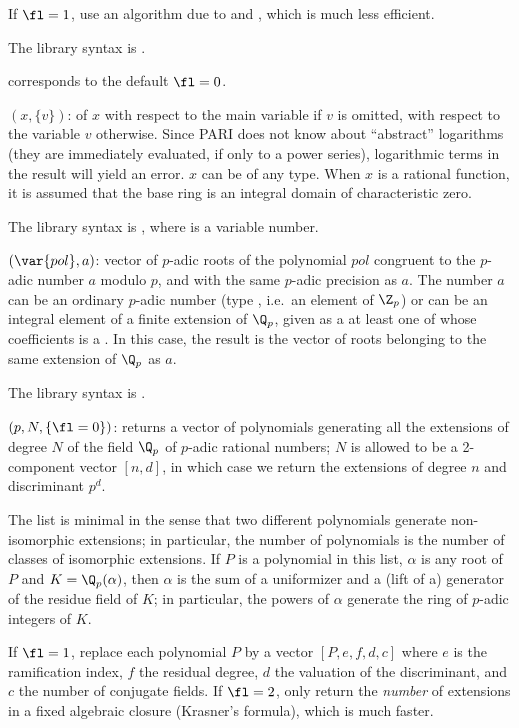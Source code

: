 If $\fl=1$, use an algorithm due to  and , which is
much less efficient.

The library syntax is .

 corresponds to the default
$\fl=0$.

$(x,\{v\})$: \label{se:intformal} of $x$ with respect to the main variable if $v$
is omitted, with respect to the variable $v$ otherwise. Since PARI does not
know about ``abstract'' logarithms (they are immediately evaluated, if only
to a power series), logarithmic terms in the result will yield an error. $x$
can be of any type. When $x$ is a rational function, it is assumed that the
base ring is an integral domain of characteristic zero.

The library syntax is , where  is a variable number.

$(\var{pol},a)$: \label{se:padicappr}vector of $p$-adic roots of the
polynomial $pol$ congruent to the $p$-adic number $a$ modulo $p$, and with
the same $p$-adic precision as $a$. The number $a$ can be an ordinary
$p$-adic number (type , i.e.~an element of $\Z_p$) or can be an
integral element of a finite extension of $\Q_p$, given as a 
at least one of whose coefficients is a . In this case, the result
is the vector of roots belonging to the same extension of $\Q_p$ as $a$.

The library syntax is .

$(p, N, \{\fl=0\})$: \label{se:padicfields}returns a vector of polynomials generating all the extensions of degree
$N$ of the field $\Q_p$ of $p$-adic rational numbers; $N$ is
allowed to be a 2-component vector $[n,d]$, in which case we return the
extensions of degree $n$ and discriminant $p^d$.

The list is minimal in the sense that two different polynomials generate
non-isomorphic extensions; in particular, the number of polynomials is the
number of classes of isomorphic extensions. If $P$ is a polynomial in this
list, $\alpha$ is any root of $P$ and $K = \Q_p(\alpha)$, then $\alpha$
is the sum of a uniformizer and a (lift of a) generator of the residue field
of $K$; in particular, the powers of $\alpha$ generate the ring of $p$-adic
integers of $K$.

If $\fl = 1$, replace each polynomial $P$ by a vector $[P, e, f, d, c]$
where $e$ is the ramification index, $f$ the residual degree, $d$ the
valuation of the discriminant, and $c$ the number of conjugate fields.
If $\fl = 2$, only return the \emph{number} of extensions in a fixed
algebraic closure (Krasner's formula), which is much faster.

